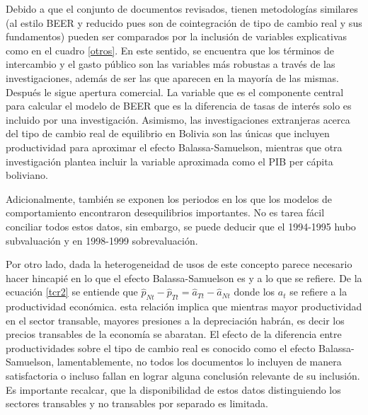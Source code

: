 \documentclass[12pt,letterpaper]{article}
\begin{document}
Debido a que el conjunto de documentos revisados, tienen metodologías similares (al estilo BEER y reducido pues son de cointegración de tipo de cambio real y sus fundamentos) pueden ser comparados por la inclusión de variables explicativas como en el cuadro \ref{otros}. En este sentido, se encuentra que los términos de intercambio y el gasto público son las variables más robustas a través de las investigaciones, además de ser las que aparecen en la mayoría de las mismas. Después le sigue apertura comercial. La variable que es el componente central para calcular el modelo de BEER que es la diferencia de tasas de interés solo es incluido por una investigación. Asimismo, las investigaciones extranjeras acerca del tipo de cambio real de equilibrio en Bolivia son las únicas que incluyen productividad para aproximar el efecto Balassa-Samuelson, mientras que otra investigación plantea incluir la variable aproximada como el PIB per cápita boliviano.

Adicionalmente, también se exponen los periodos en los que los modelos de comportamiento encontraron desequilibrios importantes. No es tarea fácil conciliar todos estos datos, sin embargo, se puede deducir que el 1994-1995 hubo subvaluación y en 1998-1999 sobrevaluación. 

Por otro lado, dada la heterogeneidad de usos de este concepto parece necesario hacer hincapié en lo que el efecto Balassa-Samuelson es y a lo que se refiere. De la ecuación \ref{tcr2} se entiende que $\hat{p}_{Nt}-\hat{p}_{Tt}=\hat{a}_{Tt}-\hat{a}_{Nt}$ donde los $a_t$ se refiere a la productividad económica. esta relación implica que mientras mayor productividad en el sector transable, mayores presiones a la depreciación habrán, es decir los precios transables de la economía se abaratan. El efecto de la diferencia entre productividades sobre el tipo de cambio real es conocido como el efecto Balassa-Samuelson, lamentablemente, no todos los documentos lo incluyen de manera satisfactoria o incluso fallan en lograr alguna conclusión relevante de su inclusión. Es importante recalcar, que la disponibilidad de estos datos distinguiendo los sectores transables y no transables por separado es limitada. 

\end{document}
